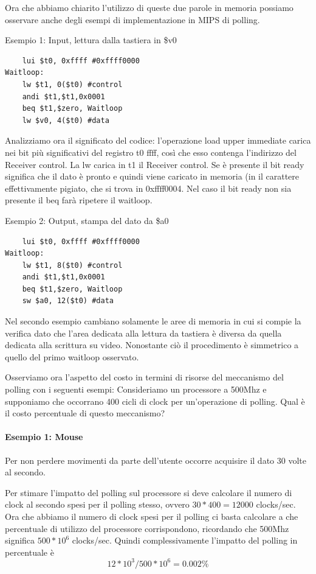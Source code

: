 \documentclass[class=book, crop=false, oneside]{standalone}
\begin{document}
Ora che abbiamo chiarito l'utilizzo di queste due parole in memoria possiamo osservare anche degli esempi di implementazione in MIPS di polling.

Esempio 1: Input, lettura dalla tastiera in \$v0
\begin{verbatim}
	lui $t0, 0xffff #0xffff0000
Waitloop:
	lw $t1, 0($t0) #control
	andi $t1,$t1,0x0001
	beq $t1,$zero, Waitloop
	lw $v0, 4($t0) #data
\end{verbatim}
Analizziamo ora il significato del codice:
l'operazione load upper immediate carica nei bit più significativi del registro t0 ffff, così che esso contenga l'indirizzo del Receiver control.
La lw carica in t1 il Receiver control.
Se è presente il bit ready significa che il dato è pronto e quindi viene caricato in memoria (in  il carattere effettivamente pigiato, che si trova in 0xffff0004.
Nel caso il bit ready non sia presente il beq farà ripetere il waitloop.

Esempio 2: Output, stampa del dato da \$a0
\begin{verbatim}
	lui $t0, 0xffff #0xffff0000
Waitloop:
	lw $t1, 8($t0) #control
	andi $t1,$t1,0x0001
	beq $t1,$zero, Waitloop
	sw $a0, 12($t0) #data
\end{verbatim}
Nel secondo esempio cambiano solamente le aree di memoria in cui si compie la verifica dato che l'area dedicata alla lettura da tastiera è diversa da quella dedicata alla scrittura su video.
Nonostante ciò il procedimento è simmetrico a quello del primo waitloop osservato.

Osserviamo ora l'aspetto del costo in termini di risorse del meccanismo del polling con i seguenti esempi:
Consideriamo un processore a 500Mhz e supponiamo che occorrano 400 cicli di clock per un’operazione di polling. Qual è il costo percentuale di questo meccanismo?

\paragraph{Esempio 1: Mouse} Per non perdere movimenti da parte dell’utente occorre acquisire il dato 30 volte al secondo.

Per stimare l'impatto del polling sul processore si deve calcolare il numero di clock al secondo spesi per il polling stesso, ovvero \(30*400 = 12000\) clocks/sec.
Ora che abbiamo il numero di clock spesi per il polling ci basta calcolare a che percentuale di utilizzo del processore corrispondono, ricordando che 500Mhz significa \(500*10^{6}\) clocks/sec.
Quindi complessivamente l'impatto del polling in percentuale è \[12*10^{3}/500*10^{6}=0.002\%\]
\end{document}
